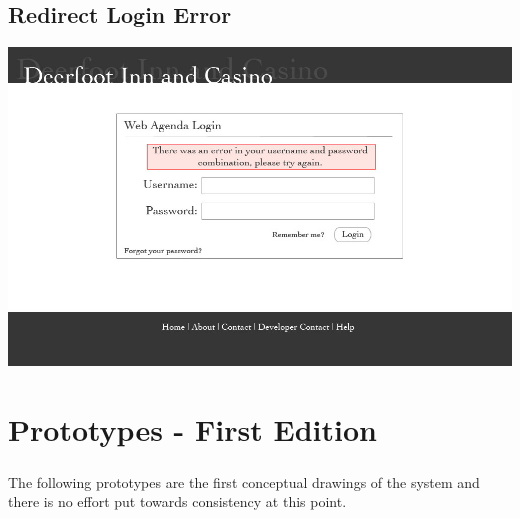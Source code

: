 \documentclass[letterpaper,12pt]{report}
\begin{document}
\begin{landscape}
\section{Redirect Login Error}
\begin{center}
 \includegraphics[scale=0.3]{prototypes/p2redirectLoginError.jpg}
\end{center}




\end{landscape}
\chapter{Prototypes - First Edition}
\paragraph*{}\hspace{0.6cm}The following prototypes are the first conceptual drawings of the system and there is no effort put towards consistency at this point.
\end{document}
